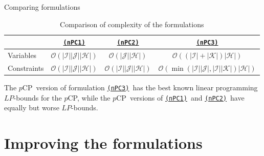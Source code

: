 \documentclass[utf8,aspectratio=169,ngerman,english]{beamer}
\newcommand{\nPC}{\hyperref[eq:nPC]{\texttt{(nPC1)}}\xspace}
\newcommand{\nPCE}{\hyperref[eq:nPCE]{\texttt{(nPC3)}}\xspace}
\newcommand{\nPCY}{\hyperref[eq:nPCY]{\texttt{(nPC2)}}\xspace}
\newcommand{\pCP}{$p$CP\xspace}
\begin{document}
\begin{frame}{Comparing formulations}
    \begin{table}
        \centering
        \caption{Comparison of complexity of the formulations}
        \label{tab:complexity}
        \begin{tabular}{l|ccc}
            \hline
                        & \nPC                                                     & \nPCY                                                     & \nPCE                                                                                        \\ \hline
            Variables   & $\mathcal O(| \mathcal I || \mathcal J || \mathcal H |)$ & $\mathcal O (| \mathcal J || \mathcal H |)$               & $\mathcal O ((| \mathcal I | + | \mathcal K |) | \mathcal H |)$                              \\
            Constraints & $\mathcal O(| \mathcal I || \mathcal J || \mathcal H |)$ & $\mathcal O (| \mathcal I || \mathcal J || \mathcal H |)$ & $\mathcal O (\min(| \mathcal I || \mathcal J |,| \mathcal I || \mathcal K |)| \mathcal H |)$ \\ \hline
        \end{tabular}%
    \end{table}\pause
    The \pCP\ version of formulation \nPCE\ has the best known linear programming $LP$-bounds for the \pCP,
    while the \pCP\ versions of \nPC\ and \nPCY\ have equally but worse $LP$-bounds.
\end{frame}

\section{Improving the formulations}
\end{document}
